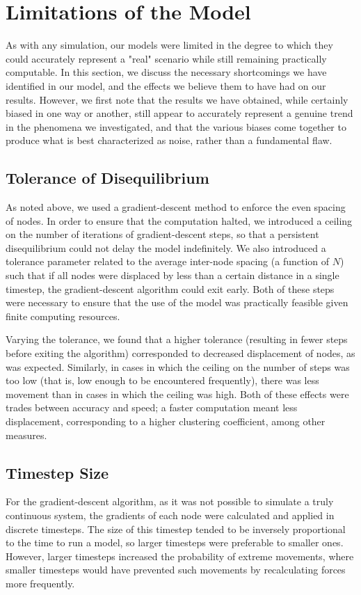 \documentclass[aps,pre,reprint,superscriptaddress,amsmath,amssymb,nofootinbib]{revtex4-1}
\begin{document}
\section{Limitations of the Model}
As with any simulation, our models were limited in the degree to which they could accurately represent a "real" scenario while still remaining practically computable.  
In this section, we discuss the necessary shortcomings we have identified in our model, and the effects we believe them to have had on our results.  
However, we first note that the results we have obtained, while certainly biased in one way or another, still appear to accurately represent a genuine trend in the phenomena we investigated, and that the various biases come together to produce what is best characterized as noise, rather than a fundamental flaw.

\subsection{Tolerance of Disequilibrium}
As noted above, we used a gradient-descent method to enforce the even spacing of nodes.  
In order to ensure that the computation halted, we introduced a ceiling on the number of iterations of gradient-descent steps, so that a persistent disequilibrium could not delay the model indefinitely.  
We also introduced a tolerance parameter related to the average inter-node spacing (a function of $N$) such that if all nodes were displaced by less than a certain distance in a single timestep, the gradient-descent algorithm could exit early.  
Both of these steps were necessary to ensure that the use of the model was practically feasible given finite computing resources.

Varying the tolerance, we found that a higher tolerance (resulting in fewer steps before exiting the algorithm) corresponded to decreased displacement of nodes, as was expected.  
Similarly, in cases in which the ceiling on the number of steps was too low (that is, low enough to be encountered frequently), there was less movement than in cases in which the ceiling was high.  
Both of these effects were trades between accuracy and speed; a faster computation meant less displacement, corresponding to a higher clustering coefficient, among other measures.

\subsection{Timestep Size}
For the gradient-descent algorithm, as it was not possible to simulate a truly continuous system, the gradients of each node were calculated and applied in discrete timesteps.  
The size of this timestep tended to be inversely proportional to the time to run a model, so larger timesteps were preferable to smaller ones.  
However, larger timesteps increased the probability of extreme movements, where smaller timesteps would have prevented such movements by recalculating forces more frequently.
\end{document}

